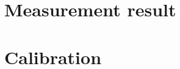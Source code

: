 		
		
	\section{Measurement result}\label{measurement_result}
	
	\section{Calibration}\label{calibration_setup}


































